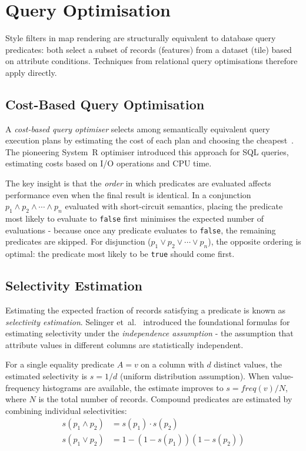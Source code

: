 \section{Query Optimisation}\label{sec_query_optimisations}

Style filters in map rendering are structurally equivalent to database query predicates: both select a subset of records (features) from a dataset (tile) based on attribute conditions.
Techniques from relational query optimisations therefore apply directly.

\subsection{Cost-Based Query Optimisation}

A \emph{cost-based query optimiser} selects among semantically equivalent query execution plans by estimating the cost of each plan and choosing the cheapest~\cite{selingerAccessPathSelection1979}.
The pioneering System~R optimiser introduced this approach for SQL queries, estimating costs based on I/O operations and CPU time.

The key insight is that the \emph{order} in which predicates are evaluated affects performance even when the final result is identical.
In a conjunction $p_1 \land p_2 \land \cdots \land p_n$ evaluated with short-circuit semantics, placing the predicate most likely to evaluate to \texttt{false} first minimises the expected number of evaluations - because once any predicate evaluates to \texttt{false}, the remaining predicates are skipped.
For disjunction ($p_1 \lor p_2 \lor \cdots \lor p_n$), the opposite ordering is optimal: the predicate most likely to be \texttt{true} should come first.

\subsection{Selectivity Estimation}

Estimating the expected fraction of records satisfying a predicate is known as \emph{selectivity estimation}.
Selinger et~al.~\cite{selingerAccessPathSelection1979} introduced the foundational formulas for estimating selectivity under the \emph{independence assumption} - the assumption that attribute values in different columns are statistically independent.

For a single equality predicate $A = v$ on a column with $d$ distinct values, the estimated selectivity is $s = 1/d$ (uniform distribution assumption).
When value-frequency histograms are available, the estimate improves to $s = \mathit{freq}(v) / N$, where $N$ is the total number of records.
Compound predicates are estimated by combining individual selectivities:
\begin{align*}\label{eq:selectivity_theory}
    s(p_1 \land p_2) &= s(p_1) \cdot s(p_2)\\
    s(p_1 \lor p_2) &= 1 - (1 - s(p_1))(1 - s(p_2))
\end{align*}

